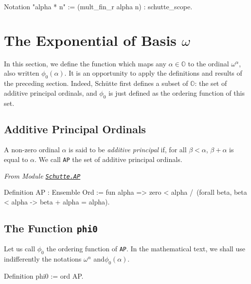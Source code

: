 {\begin{Coqsrc}
Notation "alpha * n" := (mult_fin_r alpha n) : schutte_scope.
\end{Coqsrc}

\section{The Exponential of Basis \texorpdfstring{$\omega$}{omega}}

In this section, we define the function which maps any $\alpha\in\mathbb{O}$ to
the ordinal  $\omega^\alpha$, also written 
$\phi_0(\alpha)$. 
It is an opportunity to apply the definitions and results of the preceding section. 
Indeed,  Schütte first defines a subset of $\mathbb{O}$: the set of additive principal ordinals, and $\phi_0$  is just defined as the ordering function of this set.

\subsection{Additive Principal Ordinals}


\begin{definition}
A non-zero ordinal  $\alpha$ is said to be \emph{additive principal} if, for all  $\beta<\alpha$, $\beta+\alpha$ is equal to  $\alpha$.
We call \texttt{AP} the set of additive principal ordinals.

\end{definition}



\noindent\emph{From Module \href{../theories/html/hydras.Schutte.AP.html}%
{\texttt{Schutte.AP}}}

\begin{Coqsrc}
Definition AP : Ensemble Ord :=
  fun alpha => 
  zero < alpha /\
  (forall beta, beta < alpha ->  beta + alpha = alpha).
\end{Coqsrc}

\subsection{The Function \texttt{phi0}}

Let us call  $\phi_0$ the ordering function of \texttt{AP}.
In the mathematical text, we shall use indifferently the notations  $\omega^\alpha$ and$\phi_0(\alpha)$. 

\begin{Coqsrc}
Definition phi0 := ord AP.


\end{Coqsrc}}
